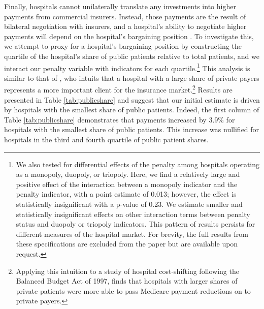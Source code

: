 \documentclass[12pt]{article}
\begin{document}
Finally, hospitals cannot unilaterally translate any investments into higher payments from commercial insurers. Instead, those payments are the result of bilateral negotiation with insurers, and a hospital's ability to negotiate higher payments will depend on the hospital's bargaining position \citep{dor2004,gowrisankaran2015,lewis2015,ho2017}. To investigate this, we attempt to proxy for a hospital's bargaining position by constructing the quartile of the hospital's share of public patients relative to total patients, and we interact our penalty variable with indicators for each quartile.\footnote{We also tested for differential effects of the penalty among hospitals operating as a monopoly, duopoly, or triopoly. Here, we find a relatively large and positive effect of the interaction between a monopoly indicator and the penalty indicator, with a point estimate of 0.013; however, the effect is statistically insignificant with a p-value of 0.23. We estimate smaller and statistically insignificant effects on other interaction terms between penalty status and duopoly or triopoly indicators. This pattern of results persists for different measures of the hospital market. For brevity, the full results from these specifications are excluded from the paper but are available upon request.} This analysis is similar to that of \cite{wu2010}, who intuits that a hospital with a large share of private payers represents a more important client for the insurance market.\footnote{Applying this intuition to a study of hospital cost-shifting following the Balanced Budget Act of 1997, \cite{wu2010} finds that hospitals with larger shares of private patients were more able to pass Medicare payment reductions on to private payers.} Results are presented in Table \ref{tab:publicshare} and suggest that our initial estimate is driven by hospitals with the smallest share of public patients. Indeed, the first column of Table \ref{tab:publicshare} demonstrates that payments increased by 3.9\% for hospitals with the smallest share of public patients. This increase was nullified for hospitals in the third and fourth quartile of public patient shares.
\end{document}
